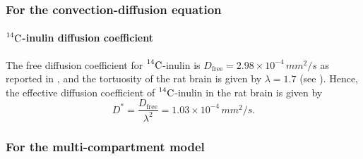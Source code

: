\documentclass[a4paper,11pt]{article} %
\newcommand{\1}{^{(1)}}
\newcommand{\2}{^{(2)}}
\newcommand{\Cinulin}{$\prescript{14}{}{\text{C}}$-inulin }
\begin{document}
\subsubsection{For the convection-diffusion equation}

\paragraph{\Cinulin diffusion coefficient}
The free diffusion coefficient for \Cinulin is $ D_\text{free} = 2.98 \times 10^{-4} \, \si{mm^2/s}$ as reported in \cite{lanman1971diffusion}, and the tortuosity of the rat brain is given by $ \lambda=1.7 $ (see \cite{Waters-2011-AB}). Hence, the effective diffusion coefficient of \Cinulin in the rat brain is given by
\[ 
  D^{*} = \frac{D_\text{free}}{\lambda^2} = 1.03\times 10^{-4} \, \si{mm^2/s}.
\]


\subsubsection{For the multi-compartment model}
\end{document}
